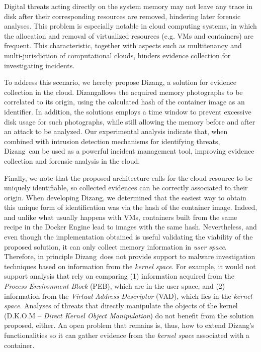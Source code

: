 \documentclass[10pt,journal,compsoc]{IEEEtran}
\newcommand{\fancyname}{Dizang}
\begin{document}
Digital threats acting directly on the system memory may not leave any trace in disk after their corresponding resources are removed, hindering later forensic analyses.
%
This problem is especially notable in cloud computing systems, in which the allocation and removal of virtualized resources (e.g. VMs and containers) are frequent.
%
This characteristic, together with aspects such as multitenancy and multi-jurisdiction of computational clouds, hinders evidence collection for investigating incidents.


To address this scenario, we hereby propose \fancyname, a solution for evidence collection in the cloud.
%
\fancyname allows the acquired memory photographs to be correlated to its origin, using the calculated hash of the container image as an identifier.
%
In addition, the solutions employs a time window to prevent excessive disk usage for such photographs, while still allowing the memory before and after an attack to be analyzed.
%
Our experimental analysis indicate that, when combined with intrusion detection mechanisms for identifying threats, \fancyname\ can be used as a powerful incident management tool, improving evidence collection and forensic analysis in the cloud.
%


Finally, we note that the proposed architecture calls for the cloud resource to be uniquely identifiable, so collected evidences can be correctly associated to their origin.
%
When developing \fancyname, we determined that the easiest way to obtain this unique form of identification was via the hash of the container image.
%
Indeed, and unlike what usually happens with VMs, containers built from the same recipe in the Docker Engine lead to images with the same hash.
%
Nevertheless, and even though the implementation obtained is useful validating the viability of the proposed solution, it can only collect memory information in \textit{user space}.
%
Therefore, in principle \fancyname\ does not provide support to malware investigation techniques based on information from the \textit{kernel space}.
%
For example, it would not support analysis that rely on comparing (1) information acquired from the \textit{Process Environment Block} (PEB), which are in the user space, and (2) information from the \textit{Virtual Address Descriptor} (VAD), which lies in the \textit{kernel space}. 
%
Analyses of threats that directly manipulate the objects of the kernel (D.K.O.M – \textit{Direct Kernel Object Manipulation}) do not benefit from the solution proposed, either.
%
An open problem that remains is, thus, how to extend \fancyname's functionalities so it can gather evidence from the \textit{kernel space} associated with a container.
\end{document}
